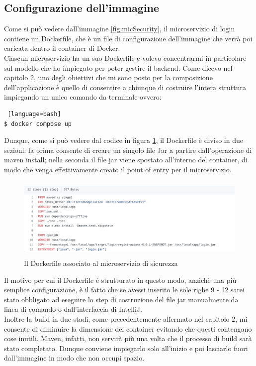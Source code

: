 \subsection{Configurazione dell'immagine}
Come si può vedere dall'immagine \ref{fig:micSecurity}, il microservizio di login contiene un Dockerfile, che è un file di configurazione dell'immagine che verrà poi caricata dentro il container di Docker.
\\
Ciascun microservizio ha un suo Dockerfile e volevo concentrarmi in particolare sul modello che ho impiegato per poter gestire il backend. Come dicevo nel capitolo 2, uno degli obiettivi che mi sono posto per la composizione dell'applicazione è quello di consentire a chiunque di costruire l'intera struttura impiegando un unico comando da terminale ovvero:
\begin{lstlisting} [language=bash]
$ docker compose up
\end{lstlisting}
Dunque, come si può vedere dal codice in figura \ref{fig:dockerfile}, il Dockerfile è diviso in due sezioni: la prima consente di creare un singolo file Jar a partire dall'operazione di maven install; nella seconda il file jar viene spostato all'interno del container, di modo che venga effettivamente creato il point of entry per il microservizio.
\\
\begin{figure}[h]
    \centering
    \includegraphics[width=450px, height=150px]{./images/security_dockerfile.png}
    \caption{Il Dockerfile associato al microservizio di sicurezza}
    \label{fig:dockerfile}
\end{figure}
Il motivo per cui il Dockerfile è strutturato in questo modo, anzichè una più semplice configurazione, è il fatto che se avessi inserito le sole righe 9 - 12 sarei stato obbligato ad eseguire lo step di costruzione del file jar manualmente da linea di comando o dall'interfaccia di IntelliJ.
\\
Inoltre la build in due stadi, come precedentemente affermato nel capitolo 2, mi consente di diminuire la dimensione dei container evitando che questi contengano cose inutili. Maven, infatti, non servirà più una volta che il processo di build sarà stato completato. Dunque conviene impiegarlo solo all'inizio e poi lasciarlo fuori dall'immagine in modo che non occupi spazio.



